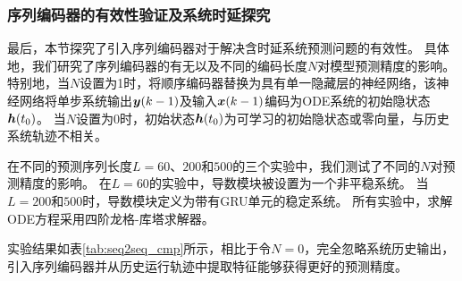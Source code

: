 \subsubsection{序列编码器的有效性验证及系统时延探究}
最后，本节探究了引入序列编码器对于解决含时延系统预测问题的有效性。
具体地，我们研究了序列编码器的有无以及不同的编码长度$N$对模型预测精度的影响。
特别地，当$N$设置为1时，将顺序编码器替换为具有单一隐藏层的神经网络，该神经网络将单步系统输出$\boldsymbol y(k-1)$及输入$\boldsymbol x(k-1)$编码为ODE系统的初始隐状态$\boldsymbol h(t_0)$。
当$N$设置为0时，初始状态$\boldsymbol h(t_0)$为可学习的初始隐状态\cite{Demeester2020SystemIW}或零向量，与历史系统轨迹不相关。

在不同的预测序列长度$L=60$、$200$和$500$的三个实验中，我们测试了不同的$N$对预测精度的影响。
在$L=60$的实验中，导数模块被设置为一个非平稳系统。
当$L=200$和$500$时，导数模块定义为带有GRU单元的稳定系统。
所有实验中，求解ODE方程采用四阶龙格-库塔求解器。

实验结果如表\ref{tab:seq2seq_cmp}所示，相比于令$N=0$，完全忽略系统历史输出，引入序列编码器并从历史运行轨迹中提取特征能够获得更好的预测精度。

